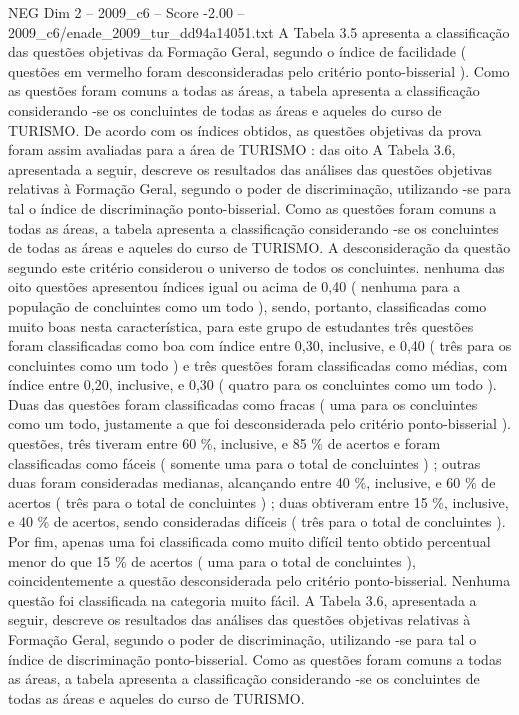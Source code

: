 \begin{textsample}{NEG Dim 2 – 2009\_c6 – Score -2.00 – 2009\_c6/enade\_2009\_tur\_dd94a14051.txt}
A Tabela 3.5 apresenta a classificação das questões objetivas da Formação Geral, segundo o índice de facilidade ( questões em vermelho foram desconsideradas pelo critério ponto-bisserial ).
Como as questões foram comuns a todas as áreas, a tabela apresenta a classificação considerando -se os concluintes de todas as áreas e aqueles do curso de TURISMO.
De acordo com os índices obtidos, as questões objetivas da prova foram assim avaliadas para a área de TURISMO : das oito A Tabela 3.6, apresentada a seguir, descreve os resultados das análises das questões objetivas relativas à Formação Geral, segundo o poder de discriminação, utilizando -se para tal o índice de discriminação ponto-bisserial.
Como as questões foram comuns a todas as áreas, a tabela apresenta a classificação considerando -se os concluintes de todas as áreas e aqueles do curso de TURISMO.
A desconsideração da questão segundo este critério considerou o universo de todos os concluintes. nenhuma das oito questões apresentou índices igual ou acima de 0,40 ( nenhuma para a população de concluintes como um todo ), sendo, portanto, classificadas como muito boas nesta característica, para este grupo de estudantes três questões foram classificadas como boa com índice entre 0,30, inclusive, e 0,40 ( três para os concluintes como um todo ) e três questões foram classificadas como médias, com índice entre 0,20, inclusive, e 0,30 ( quatro para os concluintes como um todo ).
Duas das questões foram classificadas como fracas ( uma para os concluintes como um todo, justamente a que foi desconsiderada pelo critério ponto-bisserial ). questões, três tiveram entre 60 \%, inclusive, e 85 \% de acertos e foram classificadas como fáceis ( somente uma para o total de concluintes ) ; outras duas foram consideradas medianas, alcançando entre 40 \%, inclusive, e 60 \% de acertos ( três para o total de concluintes ) ; duas obtiveram entre 15 \%, inclusive, e 40 \% de acertos, sendo consideradas difíceis ( três para o total de concluintes ).
Por fim, apenas uma foi classificada como muito difícil tento obtido percentual menor do que 15 \% de acertos ( uma para o total de concluintes ), coincidentemente a questão desconsiderada pelo critério ponto-bisserial.
Nenhuma questão foi classificada na categoria muito fácil.
A Tabela 3.6, apresentada a seguir, descreve os resultados das análises das questões objetivas relativas à Formação Geral, segundo o poder de discriminação, utilizando -se para tal o índice de discriminação ponto-bisserial.
Como as questões foram comuns a todas as áreas, a tabela apresenta a classificação considerando -se os concluintes de todas as áreas e aqueles do curso de TURISMO.

\end{textsample}
